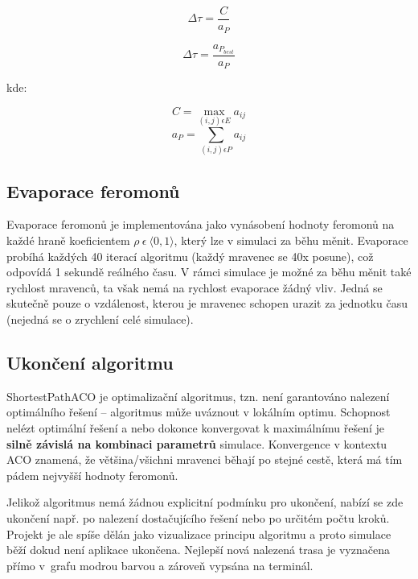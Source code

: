 \documentclass[12pt]{article}
\begin{document}
\begin{equation}
\label{3}
\Delta \tau = \frac{C}{a_P}
\end{equation}

\begin{equation}
\label{4}
\Delta \tau = \frac{a_{P_{best}}}{a_P}
\end{equation}

kde:

\begin{multicols}{2}
    \noindent
    \begin{equation*}
    C = \max_{(i,j) \epsilon E} a_{ij}
    \end{equation*}\notag
    \begin{equation*}
    a_P = \sum_{(i,j) \epsilon P} a_{ij}
    \end{equation*}\notag
\end{multicols}

\subsection{Evaporace feromonů}
\label{evap}
Evaporace feromonů je implementována jako vynásobení hodnoty feromonů na každé hraně koeficientem $ \rho \: \epsilon \: \langle 0, 1 \rangle $, který lze v simulaci za běhu měnit. Evaporace probíhá každých 40 iterací algoritmu (každý mravenec se 40x posune), což odpovídá 1 sekundě reálného času. V rámci simulace je možné za běhu měnit také rychlost mravenců, ta však nemá na rychlost evaporace žádný vliv. Jedná se skutečně pouze o vzdálenost, kterou je mravenec schopen urazit za jednotku času (nejedná se o zrychlení celé simulace).

\subsection{Ukončení algoritmu}
ShortestPathACO je optimalizační algoritmus, tzn. není garantováno nalezení optimálního řešení -- algoritmus může uváznout v lokálním optimu. Schopnost nelézt optimální řešení a nebo dokonce konvergovat k maximálnímu řešení je \textbf{silně závislá na kombinaci parametrů} simulace. Konvergence v kontextu ACO znamená, že většina/všichni mravenci běhají po stejné cestě, která má tím pádem nejvyšší hodnoty feromonů.

Jelikož algoritmus nemá žádnou explicitní podmínku pro ukončení, nabízí se zde ukončení např. po nalezení dostačujícího řešení nebo po určitém počtu kroků. Projekt je ale spíše dělán jako vizualizace principu algoritmu a proto simulace běží dokud není aplikace ukončena. Nejlepší nová nalezená trasa je vyznačena přímo v~grafu modrou barvou a zároveň vypsána na terminál.
\end{document}
